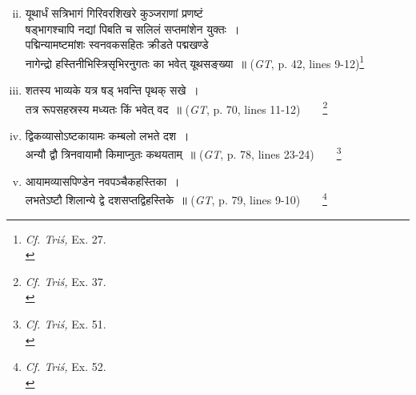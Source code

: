 \documentclass[10pt, openany]{book}
\begin{document}
\newpage

\begin{enumerate}[(i)]
  \setcounter{enumi}{1}
    \item {\qt यूथार्धं सत्रिभागं गिरिवरशिखरे कुञ्जराणां प्रणष्टं\\
    {षड्भागश्चापि नद्यां पिबति च सलिलं सप्तमांशेन युक्तः~।}\\
    {पद्मिन्यामष्टमांशः स्वनवकसहितः क्रीडते पद्मखण्डे} \\
    {नागेन्द्रो हस्तिनीभिस्त्रिसृभिरनुगतः का भवेत् यूथसङ्ख्या~॥}} \englishfont \hfill(\textit{GT}, p. 42, lines 9-12)\renewcommand{\thefootnote}{1}\footnote{\hspace{-2mm} \englishfont \textit{Cf. Triś,} Ex. 27.\\}
    \item {\qt शतस्य भाव्यके यत्र षड् भवन्ति पृथक् सखे~। \\
        तत्र रूपसहस्रस्य मध्यतः किं भवेत् वद~॥} \englishfont \hfill (\textit{GT}, p. 70, lines 11-12)~~~~\renewcommand{\thefootnote}{\hspace{-4.5mm} 2}\footnote{\hspace{-2mm} \englishfont \textit{Cf. Triś,} Ex. 37.\\}
    \item {\qt द्विकव्यासोऽष्टकायामः कम्बलो लभते दश~। \\
 अन्यौ द्वौ त्रिनवायामौ किमाप्नुतः कथयताम्~॥} \englishfont \hfill(\textit{GT}, p. 78, lines 23-24)~~~~\renewcommand{\thefootnote}{\hspace{-4.5mm} 3}\footnote{\hspace{-2mm} \englishfont \textit{Cf. Triś,} Ex. 51.\\}
    \item {\qt आयामव्यासपिण्डेन नवपञ्चैकहस्तिका~। \\
 लभतेऽष्टौ शिलान्ये द्वे दशसप्तद्विहस्तिके~॥} \englishfont \hfill (\textit{GT}, p. 79, lines 9-10)~~~~\renewcommand{\thefootnote}{\hspace{-4.5mm} 4}\footnote{\hspace{-2mm} \englishfont \textit{Cf. Triś,} Ex. 52.\\}
\end{enumerate}
\end{document}
